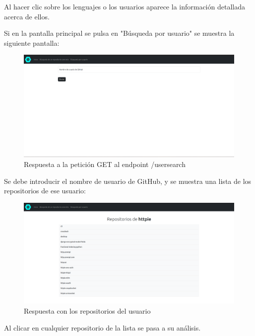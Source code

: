 \documentclass[a4paper, 12pt]{book}
\begin{document}
  Al hacer clic sobre los lenguajes o los usuarios aparece la información detallada acerca de ellos.

  Si en la pantalla principal se pulsa en "Búsqueda por usuario" se muestra la siguiente pantalla:

  \begin{figure}[H]
    \centering
    \includegraphics[width=1\textwidth]{img/usersearchget.png}
    \caption{Respuesta a la petición GET al endpoint /usersearch}
    \label{figura:usersearch2}
  \end{figure}

  Se debe introducir el nombre de usuario de GitHub, y se muestra una lista de los repositorios de ese usuario:

  \begin{figure}[H]
    \centering
    \includegraphics[width=1\textwidth]{img/httpiesearch.png}
    \caption{Respuesta con los repositorios del usuario}
    \label{figura:httpiesearch}
  \end{figure}

  Al clicar en cualquier repositorio de la lista se pasa a su análisis.

\end{document}
